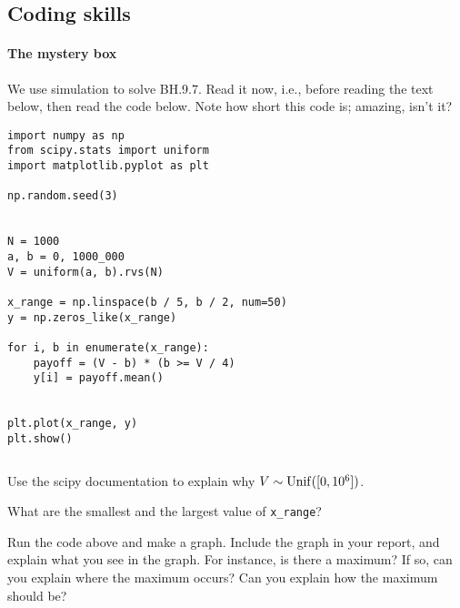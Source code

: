 \documentclass[assignments]{subfiles}
\begin{document}
\subsection{Coding skills}
\label{sec:coding-skills-1}

\paragraph{The mystery box}

We use  simulation to solve  BH.9.7.
Read it now, i.e., before reading the text below, then read the code below.
Note how short  this code is;  amazing, isn't it?



\begin{verbatim}
import numpy as np
from scipy.stats import uniform
import matplotlib.pyplot as plt

np.random.seed(3)


N = 1000
a, b = 0, 1000_000
V = uniform(a, b).rvs(N)

x_range = np.linspace(b / 5, b / 2, num=50)
y = np.zeros_like(x_range)

for i, b in enumerate(x_range):
    payoff = (V - b) * (b >= V / 4)
    y[i] = payoff.mean()


plt.plot(x_range, y)
plt.show()
\end{verbatim}


\begin{verbatim}

\end{verbatim}


\begin{exercise}
Use the scipy documentation to explain why $V\sim\mathrm{Unif}([0,10^{6}])$.
\begin{solution}
\end{solution}
\end{exercise}



\begin{exercise}
What are the smallest and the largest value of \verb|x_range|?
\begin{solution}
\end{solution}
\end{exercise}

\begin{exercise}
Run the code above and make a graph. Include the graph in your report, and explain what you see in the graph. For instance, is there a maximum? If so, can you explain where the maximum occurs? Can you explain how the maximum should be?
\begin{solution}
\end{solution}
\end{exercise}
\end{document}
